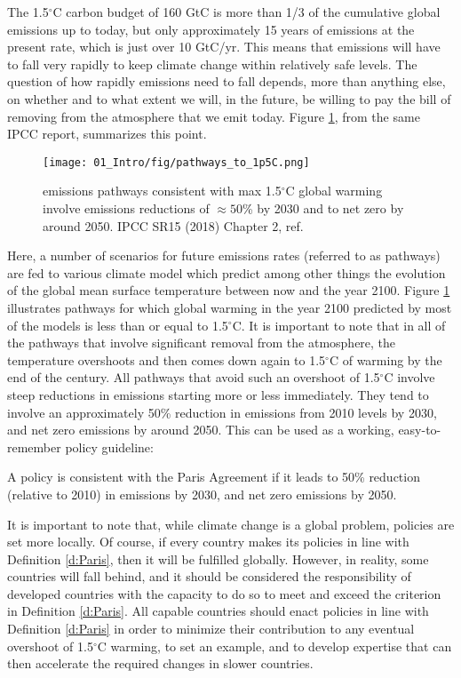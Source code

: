The 1.5$^\circ$C carbon budget of 160 GtC is more than 1/3 of the cumulative global emissions up to today, but only approximately 15 years of emissions at the present rate, which is just over 10 GtC/yr\cite{LeQuere2018}. This means that emissions will have to fall very rapidly to keep climate change within relatively safe levels. The question of how rapidly emissions need to fall depends, more than anything else, on whether and to what extent we will, in the future, be willing to pay the bill of removing  from the atmosphere that we emit today. Figure \ref{fig:paths}, from the same IPCC report, summarizes this point. 
\begin{figure}[t]
	\centering
	\texttt{[image: 01\_Intro/fig/pathways\_to\_1p5C.png]}
	\caption{ emissions pathways consistent with max 1.5$^\circ$C global warming involve emissions reductions of $\approx 50$\% by 2030 and to net zero by around 2050. IPCC SR15 (2018) Chapter 2, ref. \cite{IPCC2018_ch2}}
	\label{fig:paths}
\end{figure}

Here, a number of scenarios for future emissions rates (referred to as pathways) are fed to various climate model which predict among other things the evolution of the global mean surface temperature between now and the year 2100. Figure \ref{fig:paths} illustrates pathways for which global warming in the year 2100 predicted by most of the models is less than or equal to 1.5$^\circ$C. It is important to note that in all of the pathways that involve significant  removal from the atmosphere, the temperature overshoots and then comes down again to 1.5$^\circ$C of warming by the end of the century. All pathways that avoid such an overshoot of 1.5$^\circ$C involve steep reductions in emissions starting more or less immediately. They tend to involve an approximately 50\% reduction in  emissions from 2010 levels by 2030, and net zero emissions by around 2050\cite{IPCC2018_ch2}. This can be used as a working, easy-to-remember policy guideline:
\begin{definition}
A policy is consistent with the Paris Agreement if it leads to 50\% reduction (relative to 2010) in  emissions by 2030, and net zero emissions by 2050. \label{d:Paris}
\end{definition}

It is important to note that, while climate change is a global problem, policies are set more locally. Of course, if every country makes its policies in line with Definition \ref{d:Paris}, then it will be fulfilled globally. However, in reality, some countries will fall behind, and it should be considered the responsibility of developed countries with the capacity to do so to meet and exceed the criterion in Definition \ref{d:Paris}. 
All 
capable countries should enact policies in line with Definition \ref{d:Paris} in order to minimize their contribution to any eventual overshoot of 1.5$^\circ$C warming, to set an example, and to develop expertise that can then accelerate the required changes in slower countries.

